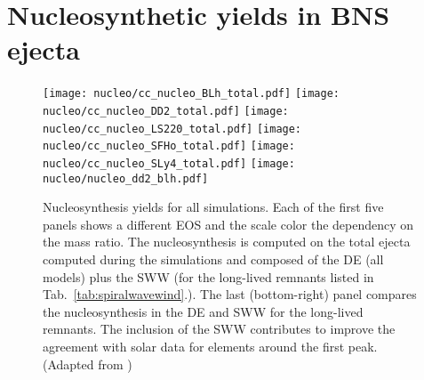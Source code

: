 


\section{Nucleosynthetic yields in \ac{BNS} ejecta}


\begin{figure*}[h!]
    \centering 
    \texttt{[image: nucleo/cc\_nucleo\_BLh\_total.pdf]}
    \texttt{[image: nucleo/cc\_nucleo\_DD2\_total.pdf]}
    \texttt{[image: nucleo/cc\_nucleo\_LS220\_total.pdf]}
    \texttt{[image: nucleo/cc\_nucleo\_SFHo\_total.pdf]}
    \texttt{[image: nucleo/cc\_nucleo\_SLy4\_total.pdf]}
    \texttt{[image: nucleo/nucleo\_dd2\_blh.pdf]}
    \caption{Nucleosynthesis yields for all simulations. Each %
        of the first five panels 
        shows a different EOS and the scale color the dependency on the
        mass ratio. The nucleosynthesis is computed on the total ejecta
        computed during the simulations and 
        composed of the \ac{DE} (all models) plus the \ac{SWW} 
        (for the long-lived remnants listed in
        Tab.~\ref{tab:spiralwavewind}.).
        The last (bottom-right) panel compares the nucleosynthesis in
        the \ac{DE} and \ac{SWW} for the long-lived
        remnants. The inclusion of the \ac{SWW} contributes to 
        improve the agreement with solar data for elements around the first peak.
        (Adapted from \citet{Nedora:2020pak})
    }
    \label{fig:nucle:totalyields}
\end{figure*}




